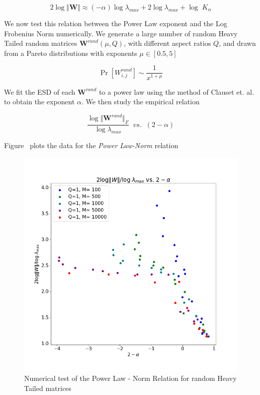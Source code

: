 $$2\log\Vert\mathbf{W}\Vert\approx(-\alpha)\log\lambda_{max}+2\log\lambda_{max}+\log\;K_{\alpha}$$

We now test this relation between the Power Law exponent and the Log Frobenius Norm numerically.
We generate a large number of random Heavy Tailed random matrices $\mathbf{W}^{rand}(\mu,Q)$, 
with different aspect ratios $Q$, and drawn from a Pareto distributions with exponents $\mu\in[0.5, 5]$

$$\Pr[{W}^{rand}_{i,j}]\sim\dfrac{1}{x^{1+\mu}}$$

We fit the ESD of each $\mathbf{W}^{rand}$ to a power law using the method of Clauset et. al.
to obtain the exponent $\alpha$.  We then study the empirical relation

$$\dfrac{\log\Vert\mathbf{W}^{rand}\Vert_{F}}{\log\lambda_{max}}\;\;vs.\;\;(2-\alpha)$$


Figure~\cite{randW} plots the data for the \emph{Power Law-Norm} relation

\begin{figure}[!htb]
 \centering
   \includegraphics[scale=0.40]{img/Alpha-LogNorm-Relations-2ma.png}
   \caption{
Numerical test of the  Power Law - Norm Relation for random Heavy Tailed matrices
}
  \label{fig:randW}
\end{figure}

